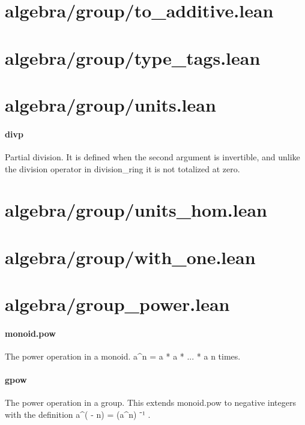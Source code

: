 \documentclass{article}
\begin{document}
\section{algebra/group/to\_additive.lean}\section{algebra/group/type\_tags.lean}\section{algebra/group/units.lean}\paragraph{divp}
\par
Partial division. It is defined when the
second argument is invertible, and unlike the division operator
in 
\colorbox[RGB]{253,246,227}{{{{\color[RGB]{101, 123, 131} division\_ring }}}} it is not totalized at zero.
\section{algebra/group/units\_hom.lean}\section{algebra/group/with\_one.lean}\section{algebra/group\_power.lean}\paragraph{monoid.pow}
\par
The power operation in a monoid. 
\colorbox[RGB]{253,246,227}{{{{\color[RGB]{101, 123, 131} a\textasciicircum{}n  }}}{{{\color[RGB]{181, 137, 0} = }}}{{{\color[RGB]{101, 123, 131}  a }}}{{{\color[RGB]{181, 137, 0} * }}}{{{\color[RGB]{101, 123, 131} a }}}{{{\color[RGB]{181, 137, 0} * }}}{{{\color[RGB]{101, 123, 131} ... }}}{{{\color[RGB]{181, 137, 0} * }}}{{{\color[RGB]{101, 123, 131} a }}}} n times.
\paragraph{gpow}
\par
The power operation in a group. This extends 
\colorbox[RGB]{253,246,227}{{{{\color[RGB]{101, 123, 131} monoid.pow }}}} to negative integers
with the definition 
\colorbox[RGB]{253,246,227}{{{{\color[RGB]{101, 123, 131} a\textasciicircum{}( }}}{{{\color[RGB]{181, 137, 0} - }}}{{{\color[RGB]{101, 123, 131} n)  }}}{{{\color[RGB]{181, 137, 0} = }}}{{{\color[RGB]{101, 123, 131}  (a\textasciicircum{}n) }}}{{{\color[RGB]{181, 137, 0} ⁻¹ }}}}.
\end{document}
